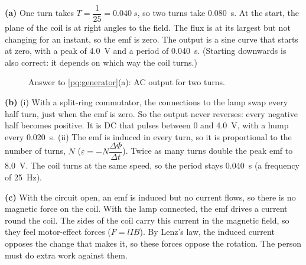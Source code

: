 \begin{practiceanswers}
\begin{practiceans}
  \textbf{(a)} One turn takes $T = \dfrac{1}{25} = \qty{0.040}{s}$, so two turns take
  \qty{0.080}{s}. At the start, the plane of the coil is at right angles to the field. The
  flux is at its largest but not changing for an instant, so the emf is zero. The output is
  a sine curve that starts at zero, with a peak of \qty{4.0}{V} and a period of
  \qty{0.040}{s}. (Starting downwards is also correct: it depends on which way the coil
  turns.)
  \begin{figure}
    \centering
    \caption*{Answer to \cref{pq:generator}(a): AC output for two turns.}
  \end{figure}

  \textbf{(b)} (i) With a split-ring commutator, the connections to the lamp swap every half
  turn, just when the emf is zero. So the output never reverses: every negative half becomes
  positive. It is DC that pulses between 0 and \qty{4.0}{V}, with a hump every
  \qty{0.020}{s}. (ii) The emf is induced in every turn, so it is proportional to the number
  of turns, $N$ ($\varepsilon = -N\dfrac{\Delta\Phi}{\Delta t}$). Twice as many turns double
  the peak emf to \qty{8.0}{V}. The coil turns at the same speed, so the period stays
  \qty{0.040}{s} (a frequency of \qty{25}{Hz}).

  \begin{modelanswer}
  \textbf{(c)} With the circuit open, an emf is induced but no current flows, so there is no magnetic
  force on the coil. With the lamp connected, the emf drives a current round the coil. The
  sides of the coil carry this current in the magnetic field, so they feel motor-effect
  forces ($F = lIB$). By Lenz's law, the induced current opposes the change that makes it,
  so these forces oppose the rotation. The person must do extra work against them.


\end{modelanswer}
\end{practiceans}
\end{practiceanswers}
